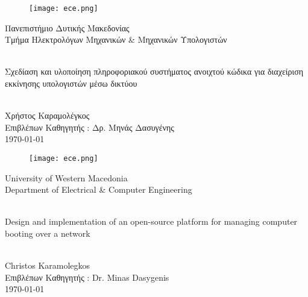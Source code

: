 \begin{titlepage}
	\begin{center}
		\begin{figure}[h]
			\centering \texttt{[image: ece.png]}
		\end{figure}
		{\LARGE Πανεπιστήμιο Δυτικής Μακεδονίας\\}
		{\Large Τμήμα Ηλεκτρολόγων Μηχανικών \& Μηχανικών Υπολογιστών}
		
		\begin{center}
			\vspace{2cm}
			
			\HRule \\[0.4cm]
			{\huge Σχεδίαση και υλοποίηση πληροφοριακού συστήματος ανοιχτού κώδικα για διαχείριση εκκίνησης υπολογιστών μέσω δικτύου\\}
			\HRule \\[0.4cm]
		\end{center}
		
		\vfill
		\begin{doublespacing}
			
			{\LARGE 
				Χρήστος Καραμολέγκος\\}
			{\Large Επιβλέπων Καθηγητής : Δρ. Μηνάς Δασυγένης\\}
			\vfill 
			{\Large \today}
		\end{doublespacing}
	\end{center}
\end{titlepage}

\blankpage

\begin{titlepage}
	\begin{center}
		\begin{figure}[h]
			\centering \texttt{[image: ece.png]}
		\end{figure}
		{\LARGE University of Western Macedonia\\}
		{\Large Department of Electrical \& Computer Engineering}
		
		\begin{center}
			\vspace{2cm}
			
			\HRule \\[0.4cm]
			{\huge Design and implementation of an open-source platform for managing computer booting over a network\\}
			\HRule \\[0.4cm]
		\end{center}
		
		\vfill
		\begin{doublespacing}
			
			{\LARGE 
				Christos Karamolegkos\\}
			{\Large Επιβλέπων Καθηγητής : Dr. Minas Dasygenis\\}
			\vfill 
			{\Large \today}
		\end{doublespacing}
	\end{center}
\end{titlepage}

